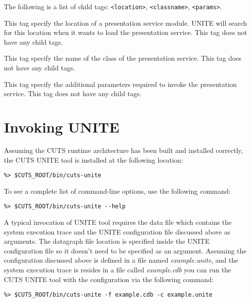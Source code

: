 \noindent The following is a list of child tags:
\texttt{<location>}, \texttt{<classname>}, \texttt{<params>}.


This tag specify the location of a presentation service module. UNITE 
will search for this location when it wants to load the presentation 
service. This tag does not have any child tags.


This tag specify the name of the class of the presentation 
service. This tag does not have any child tags.


This tag specify the additional parameters required to invoke 
the presentation service. This tag does not have any child tags.

\section{Invoking UNITE}
\label{sec:unite-invoke}

Assuming the CUTS runtime architecture has been built and installed 
correctly, the CUTS UNITE tool is installed at the following 
location:
\begin{lstlisting}
%> $CUTS_ROOT/bin/cuts-unite
\end{lstlisting}
To see a complete list of command-line options, use the following 
command:
\begin{lstlisting}
%> $CUTS_ROOT/bin/cuts-unite --help
\end{lstlisting}

A typical invocation of UNITE tool requires the data file which 
contains the system execution trace and the UNITE configuration 
file discussed above as arguments. The datagraph file location 
is specified inside the UNITE configuration file so it doesn't 
need to be specified as an argument. 
Assuming the configuration discussed above is defined in a file 
named \textit{example.unite},  and the system execution trace is resides 
in a file called \textit{example.cdb} you can run the CUTS UNITE tool with
the configuration via the following command: 
\begin{lstlisting}
%> $CUTS_ROOT/bin/cuts-unite -f example.cdb -c example.unite
\end{lstlisting}